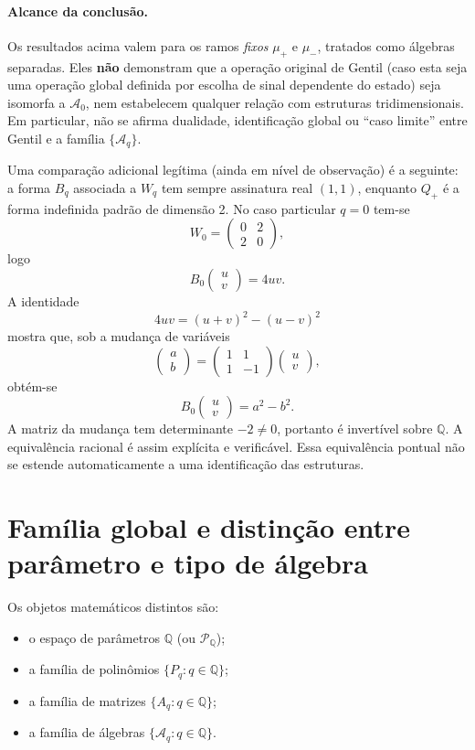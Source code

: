 \documentclass[11pt,a4paper]{article}
\begin{document}
\paragraph{Alcance da conclusão.}
Os resultados acima valem para os ramos \emph{fixos} \(\mu_+\) e
\(\mu_-\), tratados como álgebras separadas. Eles \textbf{não}
demonstram que a operação original de Gentil (caso esta seja uma
operação global definida por escolha de sinal dependente do estado)
seja isomorfa a \(\mathcal{A}_0\), nem estabelecem qualquer relação com
estruturas tridimensionais. Em particular, não se afirma dualidade,
identificação global ou “caso limite” entre Gentil e a família
\(\{\mathcal{A}_q\}\).

Uma comparação adicional legítima (ainda em nível de observação) é a
seguinte: a forma \(B_q\) associada a \(W_q\) tem sempre assinatura real
\((1,1)\), enquanto \(Q_+\) é a forma indefinida padrão de dimensão 2.
No caso particular \(q=0\) tem-se
\[
W_0=\begin{pmatrix}0&2\\2&0\end{pmatrix},
\]
logo
\[
B_0\begin{pmatrix}u\\v\end{pmatrix}=4uv.
\]
A identidade
\[
4uv=(u+v)^2-(u-v)^2
\]
mostra que, sob a mudança de variáveis
\[
\begin{pmatrix}a\\b\end{pmatrix}
=
\begin{pmatrix}1&1\\1&-1\end{pmatrix}
\begin{pmatrix}u\\v\end{pmatrix},
\]
obtém-se
\[
B_0\begin{pmatrix}u\\v\end{pmatrix}=a^2-b^2.
\]
A matriz da mudança tem determinante \(-2\neq0\), portanto é invertível
sobre \(\mathbb{Q}\). A equivalência racional é assim explícita e
verificável. Essa equivalência pontual não se estende automaticamente
a uma identificação das estruturas.

\section{Família global e distinção entre parâmetro e tipo de álgebra}

Os objetos matemáticos distintos são:
\begin{itemize}
\item o espaço de parâmetros \(\mathbb{Q}\) (ou \(\mathcal{P}_{\mathbb{Q}}\));
\item a família de polinômios \(\{P_q:q\in\mathbb{Q}\}\);
\item a família de matrizes \(\{A_q:q\in\mathbb{Q}\}\);
\item a família de álgebras \(\{\mathcal{A}_q:q\in\mathbb{Q}\}\).
\end{itemize}
\end{document}
